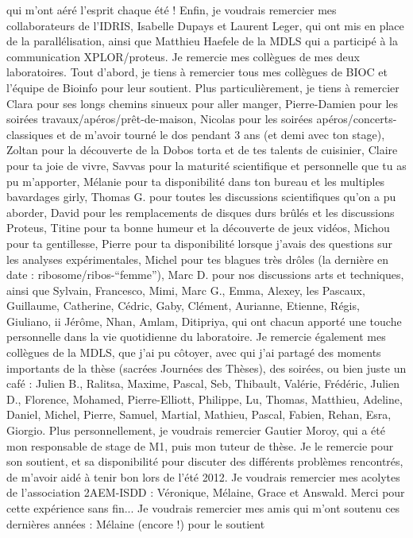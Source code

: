 qui m’ont aéré l’esprit chaque été !
Enfin, je voudrais remercier mes collaborateurs de l’IDRIS, Isabelle Dupays et Laurent
Leger, qui ont mis en place de la parallélisation, ainsi que Matthieu Haefele de la MDLS
qui a participé à la communication XPLOR/proteus.
Je remercie mes collègues de mes deux laboratoires. Tout d’abord, je tiens à remercier
tous mes collègues de BIOC et l’équipe de Bioinfo pour leur soutient. Plus particulièrement,
je tiens à remercier Clara pour ses longs chemins sinueux pour aller manger,
Pierre-Damien pour les soirées travaux/apéros/prêt-de-maison, Nicolas pour les soirées
apéros/concerts-classiques et de m’avoir tourné le dos pendant 3 ans (et demi avec ton
stage), Zoltan pour la découverte de la Dobos torta et de tes talents de cuisinier, Claire
pour ta joie de vivre, Savvas pour la maturité scientifique et personnelle que tu as pu
m’apporter, Mélanie pour ta disponibilité dans ton bureau et les multiples bavardages
girly, Thomas G. pour toutes les discussions scientifiques qu’on a pu aborder, David pour
les remplacements de disques durs brûlés et les discussions Proteus, Titine pour ta bonne
humeur et la découverte de jeux vidéos, Michou pour ta gentillesse, Pierre pour ta disponibilité
lorsque j’avais des questions sur les analyses expérimentales, Michel pour tes blagues
très drôles (la dernière en date : ribosome/ribos-“femme”), Marc D. pour nos discussions
arts et techniques, ainsi que Sylvain, Francesco, Mimi, Marc G., Emma, Alexey, les Pascaux,
Guillaume, Catherine, Cédric, Gaby, Clément, Aurianne, Etienne, Régis, Giuliano,
ii
Jérôme, Nhan, Amlam, Ditipriya, qui ont chacun apporté une touche personnelle dans la
vie quotidienne du laboratoire.
Je remercie également mes collègues de la MDLS, que j’ai pu côtoyer, avec qui j’ai
partagé des moments importants de la thèse (sacrées Journées des Thèses), des soirées, ou
bien juste un café : Julien B., Ralitsa, Maxime, Pascal, Seb, Thibault, Valérie, Frédéric,
Julien D., Florence, Mohamed, Pierre-Elliott, Philippe, Lu, Thomas, Matthieu, Adeline,
Daniel, Michel, Pierre, Samuel, Martial, Mathieu, Pascal, Fabien, Rehan, Esra, Giorgio.
Plus personnellement, je voudrais remercier Gautier Moroy, qui a été mon responsable
de stage de M1, puis mon tuteur de thèse. Je le remercie pour son soutient, et sa disponibilité
pour discuter des différents problèmes rencontrés, de m’avoir aidé à tenir bon lors de
l’été 2012. Je voudrais remercier mes acolytes de l’association 2AEM-ISDD : Véronique,
Mélaine, Grace et Answald. Merci pour cette expérience sans fin... Je voudrais remercier
mes amis qui m’ont soutenu ces dernières années : Mélaine (encore !) pour le soutient
